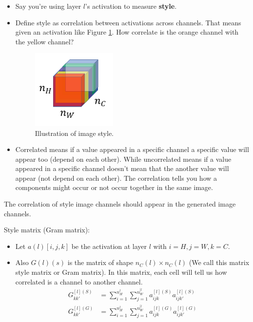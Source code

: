 \begin{itemize}
    \item Say you're using layer $l$'s activation to measure \textbf{style}.
    \item Define style as correlation between activations across channels. That means given an activation like Figure \ref{style-cost}. How correlate is the orange channel with the yellow channel?
    \begin{figure}[!htbp]
    \centering
    \includegraphics[width=0.4\textwidth]{img/c4/style-cost.png}
    \caption{Illustration of image style.}
    \label{style-cost}  
    \end{figure}  
    \item Correlated means if a value appeared in a specific channel a specific value will appear too (depend on each other). While uncorrelated means if a value appeared in a specific channel doesn't mean that the another value will appear (not depend on each other). The correlation tells you how a components might occur or not occur together in the same image.
\end{itemize}

The correlation of style image channels should appear in the generated image channels. 

Style matrix (Gram matrix):

\begin{itemize}
    \item Let $a(l)[i, j, k]$ be the activation at layer $l$ with $i=H, j=W, k=C$.
    \item Also $G(l)(s)$ is the matrix of shape $n_C(l)\times n_C(l)$ (We call this matrix style matrix or Gram matrix). In this matrix, each cell will tell us how correlated is a channel to another channel.
    \begin{equation}
        \begin{aligned}
        G_{kk'}^{[l](S)} &= \sum^{n_H^{l}}_{i=1}\sum^{n_W^{[l}}_{j=1} a_{ijk}^{[l](S)} a_{ijk'}^{[l](S)}\\
        G_{kk'}^{[l](G)} &= \sum^{n_H^{l}}_{i=1}\sum^{n_W^{[l}}_{j=1} a_{ijk}^{[l](G)} a_{ijk'}^{[l](G)}\\
        \end{aligned}
    \end{equation}
\end{itemize}

